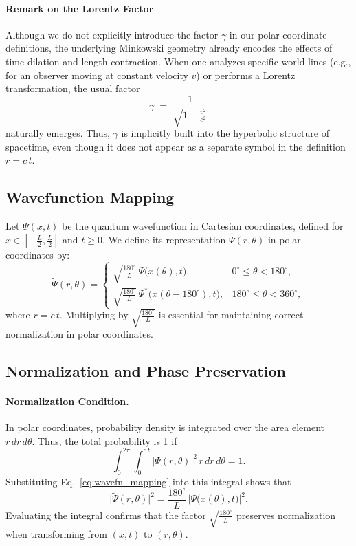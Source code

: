 \documentclass{article}
\begin{document}
\paragraph{Remark on the Lorentz Factor}
Although we do not explicitly introduce the factor $\gamma$ in our polar coordinate definitions, the underlying Minkowski geometry already encodes the effects of time dilation and length contraction. When one analyzes specific world lines (e.g., for an observer moving at constant velocity $v$) or performs a Lorentz transformation, the usual factor
\[
  \gamma \;=\; \frac{1}{\sqrt{1 - \frac{v^2}{c^2}}}
\]
naturally emerges. Thus, $\gamma$ is implicitly built into the hyperbolic structure of spacetime, even though it does not appear as a separate symbol in the definition \(r = c\,t\).

\subsection{Wavefunction Mapping}
Let \(\Psi(x,t)\) be the quantum wavefunction in Cartesian coordinates, defined for \(x \in [-\tfrac{L}{2}, \tfrac{L}{2}]\) and \(t \ge 0\). We define its representation \(\tilde{\Psi}(r,\theta)\) in polar coordinates by:
\begin{equation}
\tilde{\Psi}(r, \theta) =
\begin{cases}
\sqrt{\frac{180^\circ}{L}} \,\Psi\bigl(x(\theta), t\bigr), & 0^\circ \leq \theta < 180^\circ, \\
\sqrt{\frac{180^\circ}{L}} \,\Psi^*\bigl(x(\theta - 180^\circ), t\bigr), & 180^\circ \leq \theta < 360^\circ,
\end{cases}
\label{eq:wavefn_mapping}
\end{equation}
where \(r = c\,t\). Multiplying by \(\sqrt{\tfrac{180^\circ}{L}}\) is essential for maintaining correct normalization in polar coordinates.

\subsection{Normalization and Phase Preservation}

\paragraph{Normalization Condition.}
In polar coordinates, probability density is integrated over the area element \(r\,dr\,d\theta\). Thus, the total probability is 1 if
\begin{equation}
  \int_{0}^{2\pi} \int_{0}^{c\,t} \bigl\lvert \tilde{\Psi}(r,\theta) \bigr\rvert^2 \, r \,dr\, d\theta = 1.
  \label{eq:normalization_polar}
\end{equation}
Substituting Eq.~\eqref{eq:wavefn_mapping} into this integral shows that
\begin{equation}
  \bigl\lvert \tilde{\Psi}(r,\theta) \bigr\rvert^2 
  = \frac{180^\circ}{L} \,\bigl\lvert \Psi\bigl(x(\theta), t\bigr) \bigr\rvert^2.
\end{equation}
Evaluating the integral confirms that the factor 
\(\sqrt{\tfrac{180^\circ}{L}}\) preserves normalization when transforming from \((x,t)\) to \((r,\theta)\).
\end{document}
